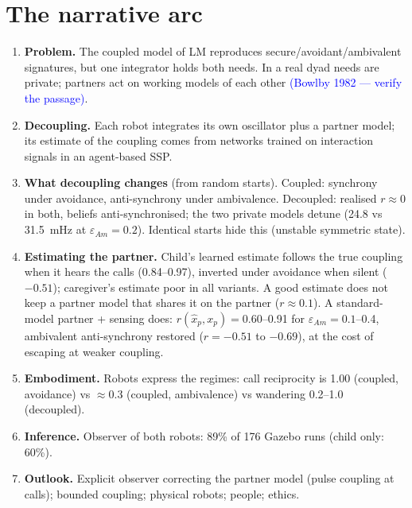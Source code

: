 \documentclass[10pt,a4paper]{article}
\newcommand{\eam}{\varepsilon_{Am}}
\newcommand{\confirm}[1]{\textcolor{blue}{#1}}
\begin{document}
\section{The narrative arc}
\begin{enumerate}[leftmargin=1.6em]
\item \textbf{Problem.} The coupled model of LM reproduces secure/avoidant/ambivalent signatures, but one integrator holds both needs. In a real dyad needs are private; partners act on working models of each other \confirm{(Bowlby 1982 --- verify the passage)}.
\item \textbf{Decoupling.} Each robot integrates its own oscillator plus a partner model; its estimate of the coupling comes from networks trained on interaction signals in an agent-based SSP.
\item \textbf{What decoupling changes} (from random starts). Coupled: synchrony under avoidance, anti-synchrony under ambivalence. Decoupled: realised $r\approx0$ in both, beliefs anti-synchronised; the two private models detune (24.8 vs 31.5~mHz at $\eam=0.2$). Identical starts hide this (unstable symmetric state).
\item \textbf{Estimating the partner.} Child's learned estimate follows the true coupling when it hears the calls (0.84--0.97), inverted under avoidance when silent ($-0.51$); caregiver's estimate poor in all variants. A good estimate does not keep a partner model that shares it on the partner ($r\approx0.1$). A standard-model partner + sensing does: $r(\hat{x}_p,x_p)=0.60$--0.91 for $\eam=0.1$--0.4, ambivalent anti-synchrony restored ($r=-0.51$ to $-0.69$), at the cost of escaping at weaker coupling.
\item \textbf{Embodiment.} Robots express the regimes: call reciprocity is 1.00 (coupled, avoidance) vs $\approx$0.3 (coupled, ambivalence) vs wandering 0.2--1.0 (decoupled).
\item \textbf{Inference.} Observer of both robots: 89\% of 176 Gazebo runs (child only: 60\%).
\item \textbf{Outlook.} Explicit observer correcting the partner model (pulse coupling at calls); bounded coupling; physical robots; people; ethics.
\end{enumerate}
\end{document}
